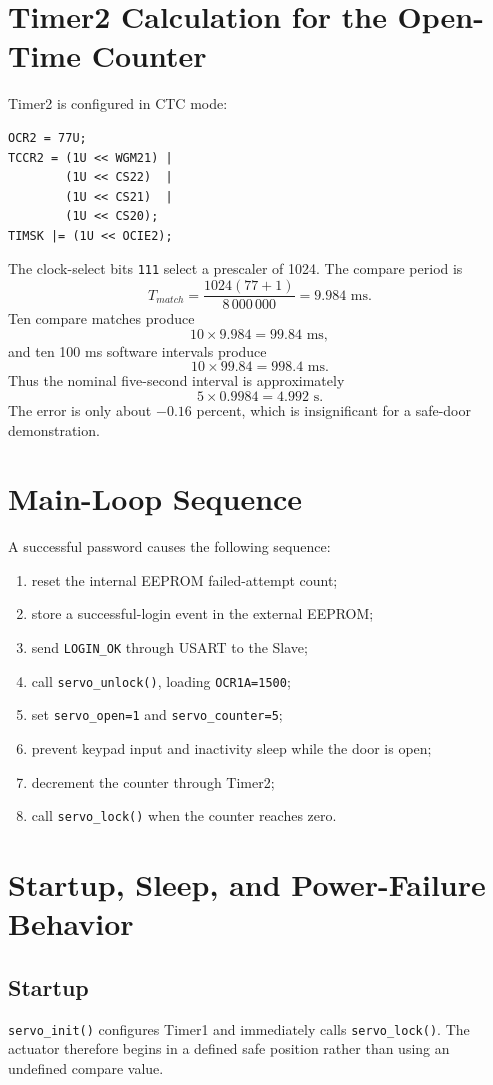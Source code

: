 \documentclass[11pt,a4paper]{article}
\begin{document}
\section{Timer2 Calculation for the Open-Time Counter}
Timer2 is configured in CTC mode:
\begin{lstlisting}[style=cstyle]
OCR2 = 77U;
TCCR2 = (1U << WGM21) |
        (1U << CS22)  |
        (1U << CS21)  |
        (1U << CS20);
TIMSK |= (1U << OCIE2);
\end{lstlisting}
The clock-select bits \texttt{111} select a prescaler of 1024. The compare period is
\[
T_{match}=\frac{1024(77+1)}{8\,000\,000}
         =9.984\text{ ms}.
\]
Ten compare matches produce
\[
10\times9.984=99.84\text{ ms},
\]
and ten 100 ms software intervals produce
\[
10\times99.84=998.4\text{ ms}.
\]
Thus the nominal five-second interval is approximately
\[
5\times0.9984=4.992\text{ s}.
\]
The error is only about \(-0.16\) percent, which is insignificant for a safe-door demonstration.

\section{Main-Loop Sequence}
A successful password causes the following sequence:
\begin{enumerate}
  \item reset the internal EEPROM failed-attempt count;
  \item store a successful-login event in the external EEPROM;
  \item send \texttt{LOGIN\_OK} through USART to the Slave;
  \item call \texttt{servo\_unlock()}, loading \texttt{OCR1A=1500};
  \item set \texttt{servo\_open=1} and \texttt{servo\_counter=5};
  \item prevent keypad input and inactivity sleep while the door is open;
  \item decrement the counter through Timer2;
  \item call \texttt{servo\_lock()} when the counter reaches zero.
\end{enumerate}

\section{Startup, Sleep, and Power-Failure Behavior}
\subsection{Startup}
\texttt{servo\_init()} configures Timer1 and immediately calls \texttt{servo\_lock()}. The actuator therefore begins in a defined safe position rather than using an undefined compare value.
\end{document}
